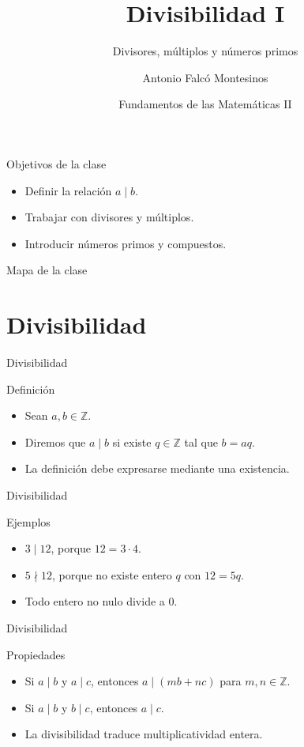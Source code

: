 \documentclass[aspectratio=169,11pt]{beamer}
\title[FdM II -- Clase 03]{Divisibilidad I}
\subtitle{Divisores, múltiplos y números primos}
\author{Antonio Falcó Montesinos}
\institute{Universidad CEU Cardenal Herrera}
\date{Fundamentos de las Matemáticas II}
\begin{document}
\begin{frame}
  \titlepage
\end{frame}

\begin{frame}{Objetivos de la clase}
\begin{itemize}
  \item Definir la relación \(a\mid b\).
  \item Trabajar con divisores y múltiplos.
  \item Introducir números primos y compuestos.
\end{itemize}
\end{frame}

\begin{frame}{Mapa de la clase}
\tableofcontents
\end{frame}

\section{Divisibilidad}

\begin{frame}{Divisibilidad}
\begin{block}{Definición}
\begin{itemize}
  \item Sean \(a,b\in\mathbb{Z}\).
  \item Diremos que \(a\mid b\) si existe \(q\in\mathbb{Z}\) tal que \(b=aq\).
  \item La definición debe expresarse mediante una existencia.
\end{itemize}
\end{block}
\end{frame}

\begin{frame}{Divisibilidad}
\begin{block}{Ejemplos}
\begin{itemize}
  \item \(3\mid 12\), porque \(12=3\cdot 4\).
  \item \(5\nmid 12\), porque no existe entero \(q\) con \(12=5q\).
  \item Todo entero no nulo divide a \(0\).
\end{itemize}
\end{block}
\end{frame}

\begin{frame}{Divisibilidad}
\begin{block}{Propiedades}
\begin{itemize}
  \item Si \(a\mid b\) y \(a\mid c\), entonces \(a\mid (mb+nc)\) para \(m,n\in\mathbb{Z}\).
  \item Si \(a\mid b\) y \(b\mid c\), entonces \(a\mid c\).
  \item La divisibilidad traduce multiplicatividad entera.
\end{itemize}
\end{block}
\end{frame}
\end{document}
